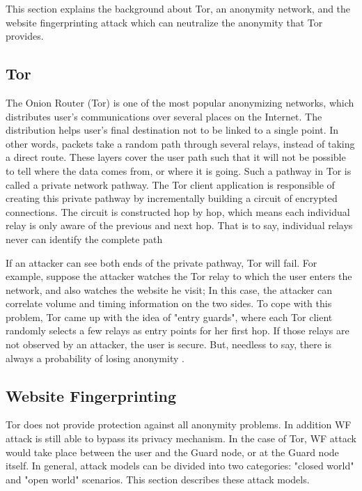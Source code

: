  
This section explains the background about Tor, an anonymity network, and the website fingerprinting attack which can neutralize the anonymity that Tor provides.

\subsection{Tor}
The Onion Router (Tor) is one of the most popular anonymizing networks, which distributes user's communications over several places on the Internet. The distribution helps user's final destination not to be linked to a single point. In other words, packets take a random path through several relays, instead of taking a direct route. These layers cover the user path such that it will not be possible to tell where the data comes from, or where it is going. Such a pathway in Tor is called a private network pathway. The Tor client application is responsible of creating this private pathway by incrementally building a circuit of encrypted connections. The circuit is constructed hop by hop, which means each individual relay is only aware of the previous and next hop. That is to say, individual relays never can identify the complete path \cite{TorPage, dingledine2004tor}

If an attacker can see both ends of the private pathway, Tor will fail. For example, suppose the attacker watches the Tor relay to which the user enters the network, and also watches the website he visit; In this case, the attacker can correlate volume and timing information on the two sides. To cope with this problem, Tor came up with the idea of "entry guards", where each Tor client randomly selects a few relays as entry points for her first hop. If those relays are not observed by an attacker, the user is secure. But, needless to say, there is always a probability of losing anonymity \cite{TorPage}.

\subsection{Website Fingerprinting}
Tor does not provide protection against all anonymity problems. In addition WF attack is still able to bypass its privacy mechanism. In the case of Tor, WF attack would take place between the user and the Guard node, or at the Guard node itself. In general, attack models can be divided into two categories: "closed world" and "open world" scenarios.  This section describes these attack models.

